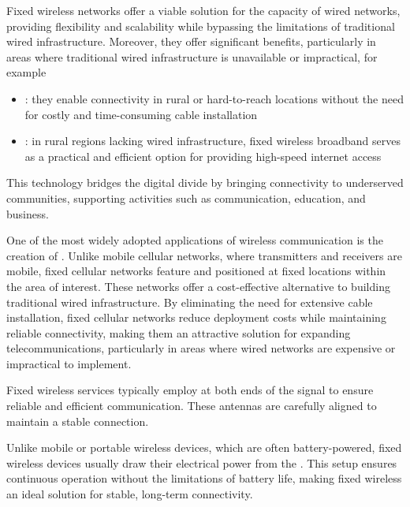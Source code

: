 \documentclass[a4paper, 12pt]{report}
\begin{document}
    Fixed wireless networks offer a viable solution for  the capacity of wired networks, providing flexibility and scalability while bypassing the limitations of traditional wired infrastructure. Moreover, they offer significant benefits, particularly in areas where traditional wired infrastructure is unavailable or impractical, for example

    \begin{itemize}
        \item {}: they enable connectivity in rural or hard-to-reach locations without the need for costly and time-consuming cable installation
        \item {}: in rural regions lacking wired infrastructure, fixed wireless broadband serves as a practical and efficient option for providing high-speed internet access
    \end{itemize}

    This technology bridges the digital divide by bringing connectivity to underserved communities, supporting activities such as communication, education, and business.

    One of the most widely adopted applications of wireless communication is the creation of . Unlike mobile cellular networks, where transmitters and receivers are mobile, fixed cellular networks feature  and  positioned at fixed locations within the area of interest. These networks offer a cost-effective alternative to building traditional wired infrastructure. By eliminating the need for extensive cable installation, fixed cellular networks reduce deployment costs while maintaining reliable connectivity, making them an attractive solution for expanding telecommunications, particularly in areas where wired networks are expensive or impractical to implement.

    Fixed wireless services typically employ  at both ends of the signal to ensure reliable and efficient communication. These antennas are carefully aligned to maintain a stable connection.

    Unlike mobile or portable wireless devices, which are often battery-powered, fixed wireless devices usually draw their electrical power from the . This setup ensures continuous operation without the limitations of battery life, making fixed wireless an ideal solution for stable, long-term connectivity.
\end{document}
